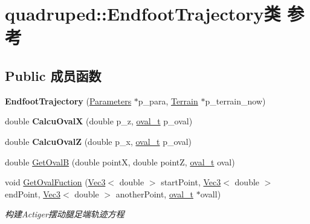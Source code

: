 \hypertarget{classquadruped_1_1EndfootTrajectory}{}\section{quadruped\+:\+:Endfoot\+Trajectory类 参考}
\label{classquadruped_1_1EndfootTrajectory}
\subsection*{Public 成员函数}
\begin{DoxyCompactItemize}
\item 
\mbox{\label{classquadruped_1_1EndfootTrajectory_a4163640cae45e8c3dedd6869c3c1eff6}} 
{\bfseries Endfoot\+Trajectory} (\hyperlink{classquadruped_1_1Parameters}{Parameters} $\ast$p\+\_\+para, \hyperlink{classquadruped_1_1Terrain}{Terrain} $\ast$p\+\_\+terrain\+\_\+now)
\item 
\mbox{\label{classquadruped_1_1EndfootTrajectory_a87bfadf8ed778c1b6a9a23225da0f080}} 
double {\bfseries Calcu\+OvalX} (double p\+\_\+z, \hyperlink{structoval__t}{oval\+\_\+t} p\+\_\+oval)
\item 
\mbox{\label{classquadruped_1_1EndfootTrajectory_a0701c295f3a4e8c9df697255f69d1cc8}} 
double {\bfseries Calcu\+OvalZ} (double p\+\_\+x, \hyperlink{structoval__t}{oval\+\_\+t} p\+\_\+oval)
\item 
double \hyperlink{classquadruped_1_1EndfootTrajectory_ae5ae8428e6a555fbcd5b1fb212966821}{Get\+OvalB} (double pointX, double pointZ, \hyperlink{structoval__t}{oval\+\_\+t} oval)
\item 
void \hyperlink{classquadruped_1_1EndfootTrajectory_afd7f3ba204c58ec5cb23b0a3e09e269d}{Get\+Oval\+Fuction} (\hyperlink{cppTypes_8h_a65c27bf97693676535dd0b30ea0ad399}{Vec3}$<$ double $>$ start\+Point, \hyperlink{cppTypes_8h_a65c27bf97693676535dd0b30ea0ad399}{Vec3}$<$ double $>$ end\+Point, \hyperlink{cppTypes_8h_a65c27bf97693676535dd0b30ea0ad399}{Vec3}$<$ double $>$ another\+Point, \hyperlink{structoval__t}{oval\+\_\+t} $\ast$ovall)
\begin{DoxyCompactList}\small\item\em 构建\+Actiger摆动腿足端轨迹方程 \end{DoxyCompactList}\item 

\end{DoxyCompactItemize}
